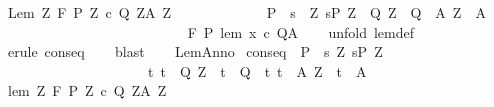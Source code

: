 \begin{isabellebody}
\endisatagproof
{\isafoldproof}%
%
\isadelimproof
\isanewline
%
\endisadelimproof
\isanewline
{}\isamarkupfalse%
\ Lem{\isacharcolon}\ {\isachardoublequoteopen}{\isasymlbrakk}{\isasymforall}Z{\isachardot}\ {\isasymGamma}{\isacharcomma}{\isasymTheta}{\isasymturnstile}\isactrlbsub {\isacharslash}F\isactrlesub \ {\isacharparenleft}P{\isacharprime}\ Z{\isacharparenright}\ c\ {\isacharparenleft}Q{\isacharprime}\ Z{\isacharparenright}{\isacharcomma}{\isacharparenleft}A{\isacharprime}\ Z{\isacharparenright}{\isacharsemicolon}\isanewline
\ \ \ \ \ \ \ \ \ \ \ \ \ P\ {\isasymsubseteq}\ {\isacharbraceleft}s{\isachardot}\ {\isasymexists}\ Z{\isachardot}\ s{\isasymin}P{\isacharprime}\ Z\ {\isasymand}\ {\isacharparenleft}Q{\isacharprime}\ Z\ {\isasymsubseteq}\ Q{\isacharparenright}\ {\isasymand}\ {\isacharparenleft}A{\isacharprime}\ Z\ {\isasymsubseteq}\ A{\isacharparenright}{\isacharbraceright}{\isasymrbrakk}\isanewline
\ \ \ \ \ \ \ \ \ \ \ \ \ {\isasymLongrightarrow}\isanewline
\ \ \ \ \ \ \ \ \ \ \ \ \ {\isasymGamma}{\isacharcomma}{\isasymTheta}{\isasymturnstile}\isactrlbsub {\isacharslash}F\isactrlesub \ P\ {\isacharparenleft}lem\ x\ c{\isacharparenright}\ Q{\isacharcomma}A{\isachardoublequoteclose}\isanewline
%
\isadelimproof
\ \ %
\endisadelimproof
%
\isatagproof
{}\isamarkupfalse%
\ {\isacharparenleft}unfold\ lem{\isacharunderscore}def{\isacharparenright}\ \isanewline
\ \ \isamarkupfalse%
\ {\isacharparenleft}erule\ conseq{\isacharparenright}\isanewline
\ \ \isamarkupfalse%
\ blast\isanewline
\ \ \isamarkupfalse%
%
\endisatagproof
{\isafoldproof}%
%
\isadelimproof
\isanewline
%
\endisadelimproof
\isanewline
{}\isamarkupfalse%
\ LemAnno{\isacharcolon}\isanewline
{}\ conseq{\isacharcolon}\ \ {\isachardoublequoteopen}P\ {\isasymsubseteq}\ {\isacharbraceleft}s{\isachardot}\ {\isasymexists}Z{\isachardot}\ s{\isasymin}P{\isacharprime}\ Z\ {\isasymand}\ \isanewline
\ \ \ \ \ \ \ \ \ \ \ \ \ \ \ \ \ \ \ \ \ {\isacharparenleft}{\isasymforall}t{\isachardot}\ t\ {\isasymin}\ Q{\isacharprime}\ Z\ {\isasymlongrightarrow}\ t\ {\isasymin}\ Q{\isacharparenright}\ {\isasymand}\ {\isacharparenleft}{\isasymforall}t{\isachardot}\ t\ {\isasymin}\ A{\isacharprime}\ Z\ {\isasymlongrightarrow}\ t\ {\isasymin}\ A{\isacharparenright}{\isacharbraceright}{\isachardoublequoteclose}\isanewline
{}\ lem{\isacharcolon}\ {\isachardoublequoteopen}{\isasymforall}Z{\isachardot}\ {\isasymGamma}{\isacharcomma}{\isasymTheta}{\isasymturnstile}\isactrlbsub {\isacharslash}F\isactrlesub \ {\isacharparenleft}P{\isacharprime}\ Z{\isacharparenright}\ c\ {\isacharparenleft}Q{\isacharprime}\ Z{\isacharparenright}{\isacharcomma}{\isacharparenleft}A{\isacharprime}\ Z{\isacharparenright}{\isachardoublequoteclose}\isanewline

\end{isabellebody}
